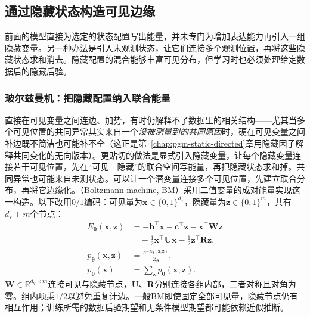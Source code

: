 \subsection{通过隐藏状态构造可见边缘}
\label{sec:pgm-energy-models-latent}

前面的模型直接为选定的状态配置写出能量，并未专门为增加表达能力再引入一组隐藏变量。另一种办法是引入未观测状态，让它们连接多个观测位置，再将这些隐藏状态求和消去。隐藏配置的混合能够丰富可见分布，但学习时也必须处理给定数据后的隐藏后验。

\subsubsection{玻尔兹曼机：把隐藏配置纳入联合能量}
\label{sec:pgm-energy-models-bm}

直接在可见变量之间连边、加势，有时仍解释不了数据里的相关结构——尤其当多个可见位置的共同异常其实来自一个\emph{没被测量到的共同原因}时，硬在可见变量之间补边既不简洁也可能补不全（这正是第~\ref{chap:pgm-static-directed}章用隐藏因子解释共同变化的无向版本）。更贴切的做法是显式引入隐藏变量，让每个隐藏变量连接若干可见位置，先在“可见＋隐藏”的联合空间写能量，再把隐藏状态求和掉。共同异常也可能来自未测状态。可以让一个潜变量连接多个可见位置，先建立联合分布，再将它边缘化。（Boltzmann machine, BM）采用二值变量的成对能量实现这一构造。以下改用$0/1$编码：可见量为$\bm{x}\in\{0,1\}^{d_{\mathrm{v}}}$，隐藏量为$\bm{z}\in\{0,1\}^m$，共有$d_{\mathrm{v}}+m$个节点：
\begin{equation}
  \begin{aligned}
    E_{\bm{\theta}}(\bm{x},\bm{z})
      &=-\bm{b}^\top\bm{x}-\bm{c}^\top\bm{z}
        -\bm{x}^\top\bm{W}\bm{z}\\
      &\quad-\frac12\bm{x}^\top\bm{U}\bm{x}
             -\frac12\bm{z}^\top\bm{R}\bm{z},\\
    p_{\bm{\theta}}(\bm{x},\bm{z})
      &=\frac{e^{-E_{\bm{\theta}}(\bm{x},\bm{z})}}
               {Z_{\bm{\theta}}},\\
    p_{\bm{\theta}}(\bm{x})
      &=\sum_{\bm{z}}p_{\bm{\theta}}(\bm{x},\bm{z}).
  \end{aligned}
  \label{eq:pgm-energy-models-bm}
\end{equation}
$\bm{W}\in\mathbb{R}^{d_{\mathrm{v}}\times m}$连接可见与隐藏节点，$\bm{U}$、$\bm{R}$分别连接各组内部，二者对称且对角为零。组内项乘$1/2$以避免重复计边。一般BM即使固定全部可见量，隐藏节点仍有相互作用；训练所需的数据后验期望和无条件模型期望都可能依赖近似推断。

